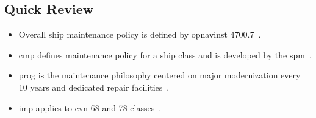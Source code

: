 \documentclass[../main.tex]{subfiles}
\begin{document}
\subsection{Quick Review}
\begin{itemize}
  \item Overall ship maintenance policy is defined by \ac{opnavinst} 4700.7~\autocite{OPNAVINST4700-7N,edo-4-1-3-fleet-maint-policy-2025}.
  \item \ac{cmp} defines maintenance policy for a ship class and is developed by the \ac{spm}~\autocite{edo-4-1-3-fleet-maint-policy-2025}.
  \item \ac{prog} is the maintenance philosophy centered on major modernization every 10 years and dedicated repair facilities~\autocite{edo-4-1-3-fleet-maint-policy-2025}.
  \item \ac{imp} applies to \ac{cvn} 68 and 78 classes~\autocite{edo-4-1-3-fleet-maint-policy-2025}.
\end{itemize}

\end{document}
